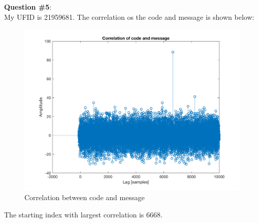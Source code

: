 \documentclass[a4paper]{article}
\begin{document}
\begin{spacing}{2.0}
\begin{enumerate}[(a)]
\end{enumerate}

\newpage
\Large\textbf{ Question \#5}:  \\
\normalsize My UFID is 21959681. The correlation os the code and message is shown below:\\
\begin{figure}[H]
\centering
\includegraphics[width = 5in]{codemessage.png}
\caption{Correlation between code and message}
\end{figure}
The starting index with largest correlation is 6668.

\end{spacing}
\end{document}
